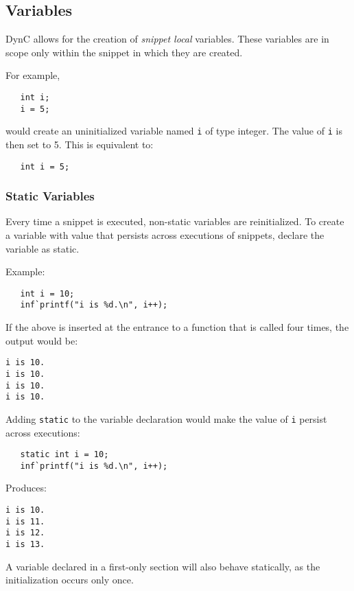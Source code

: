 \documentclass{article}
\begin{document}
\subsection{Variables}
DynC allows for the creation of \textit{snippet local} variables. These variables are in scope only within the snippet in which they are created.

\noindent For example,

\begin{lstlisting}
   int i;
   i = 5;
\end{lstlisting}

\noindent would create an uninitialized variable named \verb!i! of type integer. The value of \verb!i! is then set to 5.
This is equivalent to:

\begin{lstlisting}
   int i = 5;
\end{lstlisting}

\subsubsection{Static Variables}

Every time a snippet is executed, non-static variables are reinitialized. To create a variable with value that persists across executions of snippets, declare the variable as static. 

\noindent Example: 
\begin{lstlisting}
   int i = 10;
   inf`printf("i is %d.\n", i++);
\end{lstlisting}

\noindent If the above is inserted at the entrance to a function that is called four times, the output would be:

\begin{lstlisting}
i is 10.
i is 10.
i is 10.
i is 10.
\end{lstlisting}

\noindent Adding \verb!static! to the variable declaration would make the value of \verb!i! persist across executions:
\begin{lstlisting}
   static int i = 10;
   inf`printf("i is %d.\n", i++);
\end{lstlisting}
\noindent Produces:
\begin{lstlisting}
i is 10.
i is 11.
i is 12.
i is 13.
\end{lstlisting}

\noindent A variable declared in a first-only section will also behave statically, as the initialization occurs only once.
\end{document}
